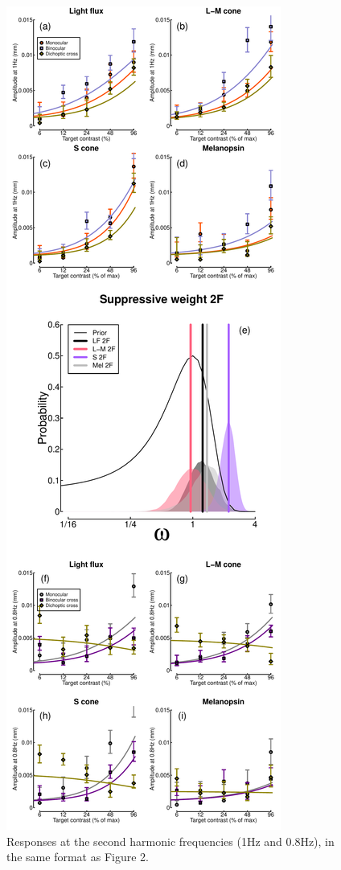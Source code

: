 \documentclass[
]{article}
\begin{document}
\begin{figure}

{\centering \includegraphics[width=0.4\linewidth]{Figures/SecondHarmonic} 

}

\caption{Responses at the second harmonic frequencies (1Hz and 0.8Hz), in the same format as Figure 2.}\label{fig:SecondHarmonicPlots}
\end{figure}
\end{document}
